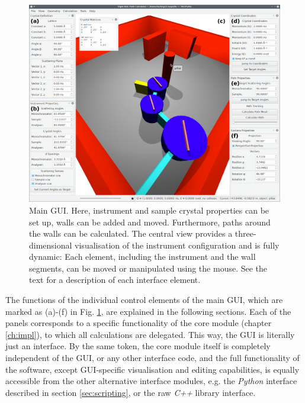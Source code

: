 \begin{figure}[htb]
		\begin{center}
			\includegraphics[width = 1 \textwidth]{figures/gui}
		\end{center}
	\caption[Main program GUI.]{Main GUI. 
		Here, instrument and sample crystal properties can be set up,
		walls can be added and moved. 
		Furthermore, paths around the walls can be calculated.
		The central view provides a three-dimensional visualisation of the instrument
		configuration and is fully dynamic: Each element, including the instrument
		and the wall segments, can be moved or manipulated using the mouse.
		See the text for a description of each interface element.
		\label{fig:gui}}
\end{figure}

The functions of the individual control elements of the main GUI, which are marked as (a)-(f)
in Fig. \ref{fig:gui}, are explained in the following sections. Each of the panels corresponds to a specific
functionality of the core module (chapter \ref{ch:impl}), to which all calculations are delegated. 
This way, the GUI is literally just an interface.
By the same token, the core module itself is completely independent of the GUI, or any other
interface code, and the full functionality of the software, except GUI-specific visualisation and editing
capabilities, is equally accessible from the other alternative interface modules, e.g. the \textit{Python}
interface described in section \ref{sec:scripting}, or the raw \textit{C++} library interface.



